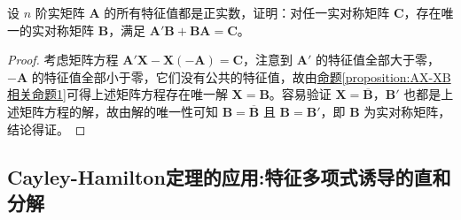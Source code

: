\documentclass[../../main.tex]{subfiles}
\begin{document}
\begin{example}
设 \(n\) 阶实矩阵 \(\boldsymbol{A}\) 的所有特征值都是正实数，证明：对任一实对称矩阵 \(\boldsymbol{C}\)，存在唯一的实对称矩阵 \(\boldsymbol{B}\)，满足 \(\boldsymbol{A}'\boldsymbol{B} + \boldsymbol{B}\boldsymbol{A} = \boldsymbol{C}\)。
\end{example}
\begin{proof}
考虑矩阵方程 \(\boldsymbol{A}'\boldsymbol{X} - \boldsymbol{X}(-\boldsymbol{A}) = \boldsymbol{C}\)，注意到 \(\boldsymbol{A}'\) 的特征值全部大于零，\(-\boldsymbol{A}\) 的特征值全部小于零，它们没有公共的特征值，故由\hyperref[proposition:AX-XB相关命题1]{命题\ref{proposition:AX-XB相关命题1}}可得上述矩阵方程存在唯一解 \(\boldsymbol{X = B}\)。容易验证 \(\boldsymbol{X = \overline{B}}\)，\(\boldsymbol{B}'\) 也都是上述矩阵方程的解，故由解的唯一性可知 \(\boldsymbol{B = \overline{B}}\) 且 \(\boldsymbol{B = B'}\)，即 \(\boldsymbol{B}\) 为实对称矩阵，结论得证。
\end{proof}


\subsection{Cayley-Hamilton定理的应用:特征多项式诱导的直和分解}
\end{document}
